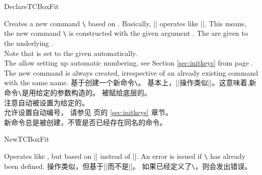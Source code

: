 \begin{docCommand}{DeclareTCBoxFit}{}
\begin{stripedbox}
Creates a new command \texttt{\textbackslash} based on .
Basically, |\DeclareTCBoxFit| operates like |\DeclareDocumentCommand|. This means,
the new command \texttt{\textbackslash} is constructed with the given argument .
The  are given to the underlying .\\
Note that  is set to the given 
automatically.\\
The  allow setting up automatic numbering,
see Section \ref{sec:initkeys} from page \pageref{sec:initkeys}.\\
The new command is always created, irrespective of an already existing
command with the same name.
\tcblower
基于创建一个新命令\texttt{\textbackslash}。%
基本上，|\DeclareTCBoxFit|操作类似|\DeclareDocumentCommand|。这意味着,新命令\texttt{\textbackslash}是用给定的参数构造的。
被赋给底层的。\\
注意自动被设置为给定的。\\
允许设置自动编号，%
请参见 \pageref{sec:initkeys} 页的 \ref{sec:initkeys} 章节。\\
新命令总是被创建，不管是否已经存在同名的命令。
\end{stripedbox}
\end{docCommand}

\begin{docCommand}{NewTCBoxFit}{}
\begin{stripedbox}
Operates like , but based on |\NewDocumentCommand| instead of |\DeclareDocumentCommand|.
An error is issued if \texttt{\textbackslash} has already been defined.
\tcblower
操作类似，但基于|\NewDocumentCommand|而不是|\DeclareDocumentCommand|。
如果已经定义了\texttt{\textbackslash}，则会发出错误。
\end{stripedbox}
\end{docCommand}

